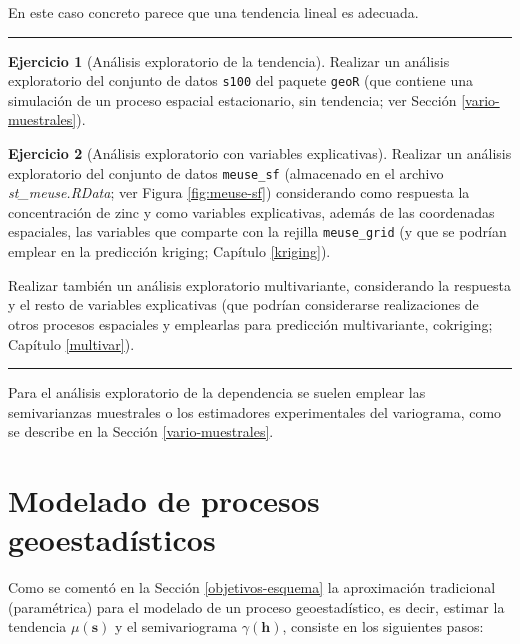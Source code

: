 \documentclass[
]{book}
\theoremstyle{break}
\theoremstyle{definition}
\theoremstyle{definition}
\theoremstyle{definition}
\newtheorem{exercise}{Ejercicio}[chapter]
\theoremstyle{definition}
\theoremstyle{remark}
\begin{document}
En este caso concreto parece que una tendencia lineal es adecuada.

\begin{center}\rule{0.5\linewidth}{0.5pt}\end{center}

\begin{exercise}[Análisis exploratorio de la tendencia]
\protect\hypertarget{exr:descriptiva}{}\label{exr:descriptiva}Realizar un análisis exploratorio del conjunto de datos \texttt{s100} del paquete \texttt{geoR}
(que contiene una simulación de un proceso espacial estacionario, sin tendencia;
ver Sección \ref{vario-muestrales}).
\end{exercise}

\begin{exercise}[Análisis exploratorio con variables explicativas]
\protect\hypertarget{exr:descriptiva2}{}\label{exr:descriptiva2}Realizar un análisis exploratorio del conjunto de datos \texttt{meuse\_sf} (almacenado en
el archivo \emph{st\_meuse.RData}; ver Figura \ref{fig:meuse-sf}) considerando como
respuesta la concentración de zinc y como variables explicativas, además de las
coordenadas espaciales, las variables que comparte con la rejilla \texttt{meuse\_grid}
(y que se podrían emplear en la predicción kriging; Capítulo \ref{kriging}).

Realizar también un análisis exploratorio multivariante, considerando la respuesta
y el resto de variables explicativas (que podrían considerarse realizaciones de
otros procesos espaciales y emplearlas para predicción multivariante, cokriging;
Capítulo \ref{multivar}).
\end{exercise}

\begin{center}\rule{0.5\linewidth}{0.5pt}\end{center}

Para el análisis exploratorio de la dependencia se suelen emplear las semivarianzas muestrales o los estimadores experimentales del variograma, como se describe en la Sección \ref{vario-muestrales}.

\chapter{Modelado de procesos geoestadísticos}\label{modelado}

Como se comentó en la Sección \ref{objetivos-esquema} la aproximación tradicional (paramétrica) para el modelado de un proceso geoestadístico, es decir, estimar la tendencia \(\mu(\mathbf{s})\) y el semivariograma \(\gamma(\mathbf{h})\), consiste en los siguientes pasos:
\end{document}
